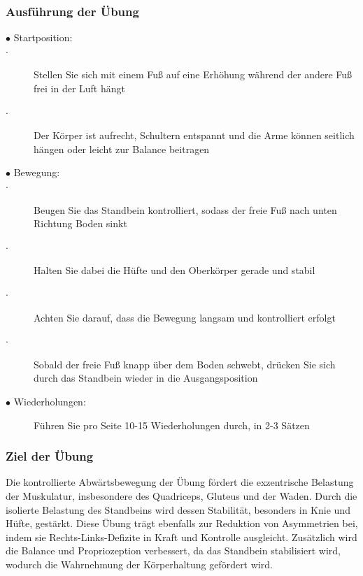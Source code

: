 \subsubsection{Ausführung der Übung}
\begin{description}
    \item[$\bullet$ Startposition:]
        \item[$\cdot$ ] Stellen Sie sich mit einem Fuß auf eine Erhöhung während der andere Fuß frei in der Luft hängt
        \item[$\cdot$ ]Der Körper ist aufrecht, Schultern entspannt und die Arme können seitlich hängen oder leicht zur Balance beitragen
     \item[$\bullet$ Bewegung:]
        \item[$\cdot$ ] Beugen Sie das Standbein kontrolliert, sodass der freie Fuß nach unten Richtung Boden sinkt
        \item[$\cdot$ ]Halten Sie dabei die Hüfte und den Oberkörper gerade und stabil
        \item[$\cdot$ ] Achten Sie darauf, dass die Bewegung langsam und kontrolliert erfolgt
        \item[$\cdot$ ] Sobald der freie Fuß knapp über dem Boden schwebt, drücken Sie sich durch das Standbein wieder in die Ausgangsposition
    \item[$\bullet$ Wiederholungen:]Führen Sie pro Seite 10-15 Wiederholungen durch, in 2-3 Sätzen

\end{description}

\subsubsection{Ziel der Übung}

Die kontrollierte Abwärtsbewegung der Übung fördert die exzentrische Belastung der Muskulatur, insbesondere des Quadriceps, Gluteus und der Waden.
Durch die isolierte Belastung des Standbeins wird dessen Stabilität, besonders in Knie und Hüfte, gestärkt.
Diese Übung trägt ebenfalls zur Reduktion von Asymmetrien bei, indem sie Rechts-Links-Defizite in Kraft und Kontrolle ausgleicht.
Zusätzlich wird die Balance und Propriozeption verbessert, da das Standbein stabilisiert wird, wodurch die Wahrnehmung der Körperhaltung gefördert wird.


